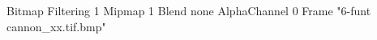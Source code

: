 {Bitmap
	{Filtering 1}
	{Mipmap 1}
	{Blend none}
	{AlphaChannel 0}
	{Frame "6-funt cannon_xx.tif.bmp"}
}
